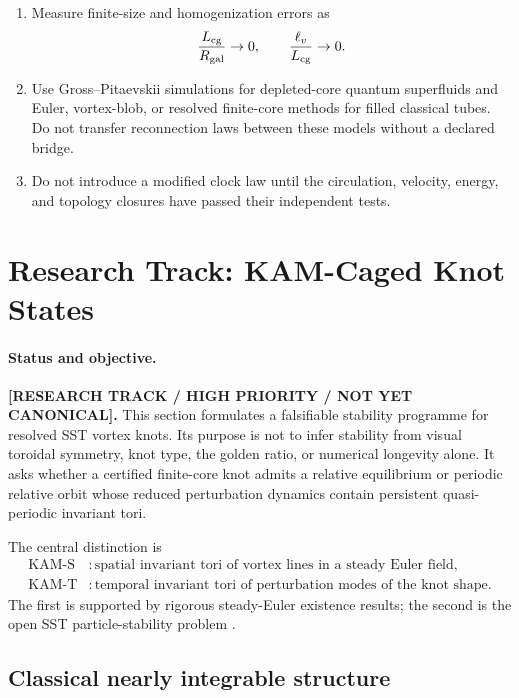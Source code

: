 \begin{enumerate}
\item
Measure finite-size and homogenization errors as
\[
\frac{L_{\rm cg}}{R_{\rm gal}}\rightarrow0,
\qquad
\frac{\ell_v}{L_{\rm cg}}\rightarrow0.
\]

\item
Use Gross--Pitaevskii simulations for depleted-core quantum superfluids and
Euler, vortex-blob, or resolved finite-core methods for filled classical
tubes.  Do not transfer reconnection laws between these models without a
declared bridge.

\item
Do not introduce a modified clock law until the circulation, velocity,
energy, and topology closures have passed their independent tests.

\end{enumerate}


\section{Research Track: KAM-Caged Knot States}
\label{sec:rt_kam_caged_knot_states}

\paragraph{Status and objective.}
\textbf{[RESEARCH TRACK / HIGH PRIORITY / NOT YET CANONICAL].}
This section formulates a falsifiable stability programme for resolved SST
vortex knots.  Its purpose is not to infer stability from visual toroidal
symmetry, knot type, the golden ratio, or numerical longevity alone.  It asks
whether a certified finite-core knot admits a relative equilibrium or periodic
relative orbit whose reduced perturbation dynamics contain persistent
quasi-periodic invariant tori.

The central distinction is
\begin{align}
    \mathrm{KAM\mbox{-}S}
    &:
    \text{spatial invariant tori of vortex lines in a steady Euler field},
    \\
    \mathrm{KAM\mbox{-}T}
    &:
    \text{temporal invariant tori of perturbation modes of the knot shape}.
    \label{eq:rt_kam_ST_split}
\end{align}
The first is supported by rigorous steady-Euler existence results; the second
is the open SST particle-stability problem
\cite{KhesinKuksinPeraltaSalas2014,EncisoPeraltaSalas2015}.

\subsection{Classical nearly integrable structure}
\label{subsec:rt_kam_classical_structure}

